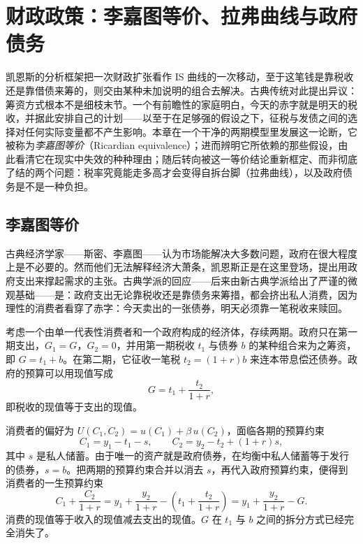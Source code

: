 \chapter{财政政策：李嘉图等价、拉弗曲线与政府债务}
\label{ch:fiscal}

凯恩斯的分析框架把一次财政扩张看作 IS 曲线的一次移动，至于这笔钱是靠税收还是靠借债来筹的，则交由某种未加说明的组合去解决。古典传统对此提出异议：筹资方式根本不是细枝末节。一个有前瞻性的家庭明白，今天的赤字就是明天的税收，并据此安排自己的计划——以至于在足够强的假设之下，征税与发债之间的选择对任何实际变量都不产生影响。本章在一个干净的两期模型里发展这一论断，它被称为\emph{李嘉图等价}（Ricardian equivalence）；进而辨明它所依赖的那些假设，由此看清它在现实中失效的种种理由；随后转向被这一等价结论重新框定、而非彻底了结的两个问题：税率究竟能走多高才会变得自拆台脚（拉弗曲线），以及政府债务是不是一种负担。

\section{李嘉图等价}

古典经济学家——斯密、李嘉图——认为市场能解决大多数问题，政府在很大程度上是不必要的。然而他们无法解释经济大萧条，凯恩斯正是在这里登场，提出用政府支出来撑起需求的主张。古典学派的回应——后来由新古典学派给出了严谨的微观基础——是：政府支出无论靠税收还是靠债务来筹措，都会挤出私人消费，因为理性的消费者看穿了赤字：今天卖出的一张债券，明天必须靠一笔税收来赎回。

考虑一个由单一代表性消费者和一个政府构成的经济体，存续两期。政府只在第一期支出，$G_1=G$，$G_2=0$，并用第一期税收 $t_1$ 与债券 $b$ 的某种组合来为之筹资，即 $G=t_1+b$。在第二期，它征收一笔税 $t_2=(1+r)b$ 来连本带息偿还债券。政府的预算可以用现值写成
\[
G = t_1 + \frac{t_2}{1+r},
\]
即税收的现值等于支出的现值。


消费者的偏好为 $U(C_1,C_2)=u(C_1)+\beta\,u(C_2)$，面临各期的预算约束
\[
C_1 = y_1 - t_1 - s, \qquad C_2 = y_2 - t_2 + (1+r)s,
\]
其中 $s$ 是私人储蓄。由于唯一的资产就是政府债券，在均衡中私人储蓄等于发行的债券，$s=b$。把两期的预算约束合并以消去 $s$，再代入政府预算约束，便得到消费者的一生预算约束
\[
C_1 + \frac{C_2}{1+r}
= y_1 + \frac{y_2}{1+r} - \left(t_1 + \frac{t_2}{1+r}\right)
= y_1 + \frac{y_2}{1+r} - G.
\]
消费的现值等于收入的现值减去支出的现值。$G$ 在 $t_1$ 与 $b$ 之间的拆分方式已经完全消失了。

